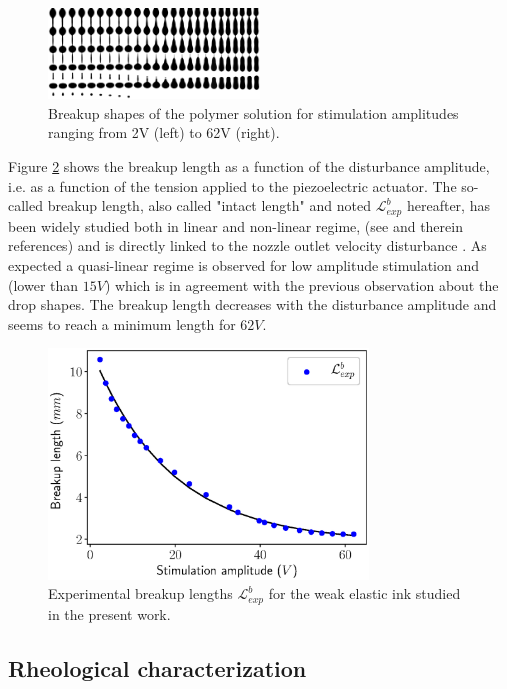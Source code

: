 \documentclass[twocolumn,10pt]{asme2ej}
\begin{document}
\begin{figure}[h]
    \centering
    \includegraphics[width=0.5\textwidth]{Encre/expAll.png}
    \caption{Breakup shapes of the polymer solution for stimulation amplitudes ranging from 2V (left) to 62V (right).} 
    \label{fig:expAll}
\end{figure}
Figure \ref{fig:LbInk} shows the breakup length as a function of the disturbance amplitude, i.e. as a function of the tension applied to the piezoelectric actuator. The so-called breakup length, also called "intact length" and noted $\mathcal{L}^b_{exp}$ hereafter, has been widely studied both in linear and non-linear regime, (see \cite{eggers2008physics} and therein references) and is directly linked to the nozzle outlet velocity disturbance \cite{pimbley1977satellite,rosello2018influence}. As expected a quasi-linear regime is observed for low  amplitude stimulation and (lower than $15V$) which is in agreement with the previous observation about the drop shapes. The breakup length decreases with the disturbance amplitude and seems to reach a minimum length for $62V$.

\begin{figure}[h]
    \centering
    \includegraphics[width=8.5cm]{LbInk.eps}
    \caption{Experimental breakup lengths $\mathcal{L}^b_{exp}$ for the weak elastic ink studied in the present work.}
    \label{fig:LbInk}
\end{figure}

\subsection{Rheological characterization}\label{sec:rheo}
\end{document}
